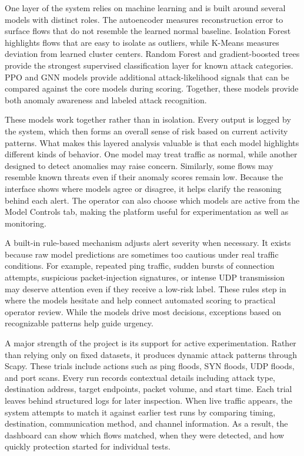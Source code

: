 \documentclass[conference]{IEEEtran}
\begin{document}
One layer of the system relies on machine learning and is built around several models with distinct roles. The autoencoder measures reconstruction error to surface flows that do not resemble the learned normal baseline. Isolation Forest highlights flows that are easy to isolate as outliers, while K-Means measures deviation from learned cluster centers. Random Forest and gradient-boosted trees provide the strongest supervised classification layer for known attack categories. PPO and GNN models provide additional attack-likelihood signals that can be compared against the core models during scoring. Together, these models provide both anomaly awareness and labeled attack recognition.

These models work together rather than in isolation. Every output is logged by the system, which then forms an overall sense of risk based on current activity patterns. What makes this layered analysis valuable is that each model highlights different kinds of behavior. One model may treat traffic as normal, while another designed to detect anomalies may raise concern. Similarly, some flows may resemble known threats even if their anomaly scores remain low. Because the interface shows where models agree or disagree, it helps clarify the reasoning behind each alert. The operator can also choose which models are active from the Model Controls tab, making the platform useful for experimentation as well as monitoring.

A built-in rule-based mechanism adjusts alert severity when necessary. It exists because raw model predictions are sometimes too cautious under real traffic conditions. For example, repeated ping traffic, sudden bursts of connection attempts, suspicious packet-injection signatures, or intense UDP transmission may deserve attention even if they receive a low-risk label. These rules step in where the models hesitate and help connect automated scoring to practical operator review. While the models drive most decisions, exceptions based on recognizable patterns help guide urgency.

A major strength of the project is its support for active experimentation. Rather than relying only on fixed datasets, it produces dynamic attack patterns through Scapy. These trials include actions such as ping floods, SYN floods, UDP floods, and port scans. Every run records contextual details including attack type, destination address, target endpoints, packet volume, and start time. Each trial leaves behind structured logs for later inspection. When live traffic appears, the system attempts to match it against earlier test runs by comparing timing, destination, communication method, and channel information. As a result, the dashboard can show which flows matched, when they were detected, and how quickly protection started for individual tests.
\end{document}
